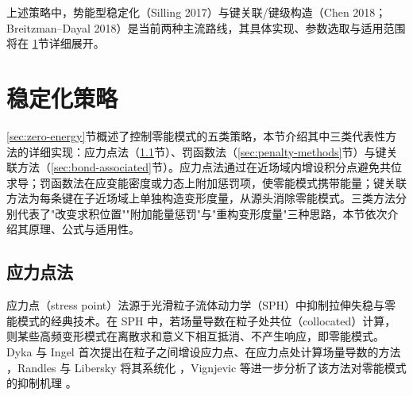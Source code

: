 上述策略中，势能型稳定化（Silling 2017）与键关联/键级构造（Chen 2018；Breitzman–Dayal 2018）是当前两种主流路线，其具体实现、参数选取与适用范围将在 \ref{sec:stabilization}节详细展开。

\section{稳定化策略}\label{sec:stabilization}

\ref{sec:zero-energy}节概述了控制零能模式的五类策略，本节介绍其中三类代表性方法的详细实现：应力点法（\ref{sec:stress-point}节）、罚函数法（\ref{sec:penalty-methods}节）与键关联方法（\ref{sec:bond-associated}节）。应力点法通过在近场域内增设积分点避免共位求导；罚函数法在应变能密度或力态上附加惩罚项，使零能模式携带能量；键关联方法为每条键在子近场域上单独构造变形度量，从源头消除零能模式。三类方法分别代表了"改变求积位置""附加能量惩罚"与"重构变形度量"三种思路，本节依次介绍其原理、公式与适用性。

\subsection{应力点法}\label{sec:stress-point}

应力点（stress point）法源于光滑粒子流体动力学（SPH）中抑制拉伸失稳与零能模式的经典技术。在 SPH 中，若场量导数在粒子处共位（collocated）计算，则某些高频变形模式在离散求和意义下相互抵消、不产生响应，即零能模式。Dyka 与 Ingel 首次提出在粒子之间增设应力点、在应力点处计算场量导数的方法 \cite{DykaIngel1995}，Randles 与 Libersky 将其系统化 \cite{RandlesLibersky1996}，Vignjevic 等进一步分析了该方法对零能模式的抑制机理 \cite{Vignjevic2000}。

